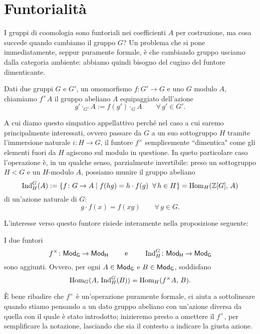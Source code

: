 \section{Funtorialità}
I gruppi di coomologia sono funtoriali nei coefficienti $ A $ per costruzione, ma cosa succede quando cambiamo il gruppo $ G $? Un problema che si pone immediatamente, seppur puramente formale, è che cambiando gruppo usciamo dalla categoria ambiente: abbiamo quindi bisogno del cugino del funtore dimenticante.

\begin{definition}
	Dati due gruppi $ G $ e $ G' $, un omomorfismo $ f \colon G' \to G $ e uno $ G $ modulo $ A $, chiamiamo $ f^\times A $ il gruppo abeliano $ A $ equipaggiato dell'azione
	\[ g' \cdot_{G'} A := f(g') \cdot_{G} A \qquad \forall\, g' \in G'. \]
\end{definition}

A cui diamo questo simpatico appellattivo perché nel caso a cui saremo principalmente interessati, ovvero passare da $ G $ a un suo sottogruppo $ H $ tramite l'immersione naturale $ i \colon H \to G $, il funtore $ f^\times $ semplicemente \textquotedblleft dimentica" come gli elementi fuori da $ H $ agiscono sul modulo in questione. In queto particolare caso l'operazione è, in un qualche senso, parzialmente invertibile: preso un sottogruppo $ H < G $ e un $ H $-modulo $ A $, possiamo munire il gruppo abeliano
\[ \operatorname{Ind}_H^G(A) := \{ f \colon G \to A \mid f(hg) = h \cdot f(g) \;\; \forall\, h \in H \} = \operatorname{Hom}_H(\mathbb{Z}[G], \, A) \]
di un'azione naturale di $ G $:
\[g \cdot f(x) = f(xg) \qquad\forall\, g \in G. \]

L'interesse verso questo funtore risiede interamente nella proposizione seguente:
\label{aggiunzione}

\begin{proposition}
	I due funtori
	\[ f^\times \colon \mathsf{Mod}_\mathsf{G} \to \mathsf{Mod}_\mathsf{H} \qquad\text{ e }\qquad  \operatorname{Ind}_H^G \colon \mathsf{Mod}_\mathsf{H} \to \mathsf{Mod}_\mathsf{G} \]
	sono aggiunti. Ovvero, per ogni $ A \in \mathsf{Mod}_\mathsf{G} $ e $ B \in \mathsf{Mod}_\mathsf{G} $, soddisfano
	\[ \operatorname{Hom}_G(A,\, \operatorname{Ind}_H^G(B)) = \operatorname{Hom}_H(f^\times A, \, B). \]
\end{proposition}

È bene ribadire che $ f^\times $ è un'operazione puramente formale, ci aiuta a sottolineare quando stiamo pensando a un dato gruppo abeliano con un'azione diversa da quella con il quale è stato introdotto; inizieremo presto a omettere il $ f^\times $, per semplificare la notazione, lasciando che sia il contesto a indicare la giusta azione.

